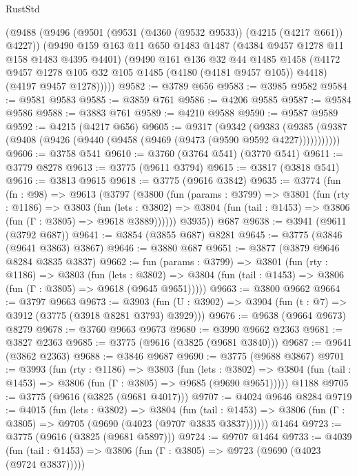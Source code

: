 \begin{lexlean}{RustStd}
\begin{coremodule}
    (@9488
      (@9496
        (@9501 (@9531 (@4360 (@9532 @9533)) (@4215 (@4217 @661)) @4227))
        (@9490
          @159
          @163
          @11
          @650
          @1483
          @1487
          (@4384 @9457 @1278 @11 @158 @1483 @4395 @4401)
          (@9490
            @161
            @136
            @32
            @44
            @1485
            @1458
            (@4172 @9457 @1278 @105 @32 @105 @1485 (@4180 (@4181 @9457 @105)) @4418)
            (@4197 @9457 @1278)))))
@9582 := @3789 @656
@9583 := @3985 @9582
@9584 := @9581 @9583
@9585 := @3859 @761
@9586 := @4206 @9585
@9587 := @9584 @9586
@9588 := @3883 @761
@9589 := @4210 @9588
@9590 := @9587 @9589
@9592 := @4215 (@4217 @656)
@9605 := @9317
    (@9342
      (@9383 (@9385 (@9387 (@9408 (@9426 (@9440 (@9458 (@9469 (@9473 (@9590 @9592 @4227)))))))))))
@9606 := @3758 @541
@9610 := @3760 (@3764 @541) (@3770 @541)
@9611 := @3779 @8278
@9613 := @3775 (@9611 @3794)
@9615 := @3817 (@3818 @541)
@9616 := @3813 @9615
@9618 := @3775 (@9616 @3842)
@9635 := @3774
    (fun (fn : @98) =>
    @9613
      (@3797
        (@3800
          (fun (params : @3799) =>
          @3801
            (fun (rty : @1186) =>
            @3803
              (fun (lets : @3802) =>
              @3804 (fun (tail : @1453) => @3806 (fun (Γ : @3805) => @9618 @3889))))))
        @3935))
    @687
@9638 := @3941 (@9611 (@3792 @687))
@9641 := @3854 (@3855 @687) @8281
@9645 := @3775 (@3846 (@9641 @3863) @3867)
@9646 := @3880 @687
@9651 := @3877 (@3879 @9646 @8284 @3835 @3837)
@9662 := fun (params : @3799) =>
  @3801
    (fun (rty : @1186) =>
    @3803
      (fun (lets : @3802) =>
      @3804 (fun (tail : @1453) => @3806 (fun (Γ : @3805) => @9618 (@9645 @9651)))))
@9663 := @3800 @9662
@9664 := @3797 @9663
@9673 := @3903 (fun (U : @3902) => @3904 (fun (t : @7) => @3912 (@3775 (@3918 @8281 @3793) @3929)))
@9676 := @9638 (@9664 @9673) @8279
@9678 := @3760 @9663 @9673
@9680 := @3990 @9662 @2363
@9681 := @3827 @2363
@9685 := @3775 (@9616 (@3825 (@9681 @3840)))
@9687 := @9641 (@3862 @2363)
@9688 := @3846 @9687
@9690 := @3775 (@9688 @3867)
@9701 := @3993
    (fun (rty : @1186) =>
    @3803
      (fun (lets : @3802) =>
      @3804 (fun (tail : @1453) => @3806 (fun (Γ : @3805) => @9685 (@9690 @9651)))))
    @1188
@9705 := @3775 (@9616 (@3825 (@9681 @4017)))
@9707 := @4024 @9646 @8284
@9719 := @4015
    (fun (lets : @3802) =>
    @3804
      (fun (tail : @1453) => @3806 (fun (Γ : @3805) => @9705 (@9690 (@4023 (@9707 @3835 @3837))))))
    @1464
@9723 := @3775 (@9616 (@3825 (@9681 @5897)))
@9724 := @9707 @1464
@9733 := @4039
    (fun (tail : @1453) => @3806 (fun (Γ : @3805) => @9723 (@9690 (@4023 (@9724 @3837)))))

\end{coremodule}
\end{lexlean}

